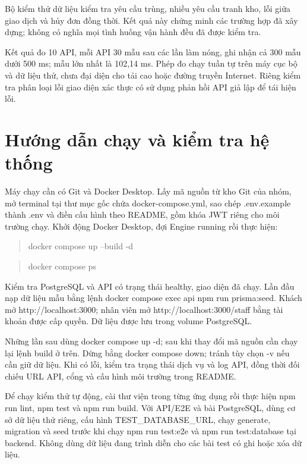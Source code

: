 \documentclass[12pt,a4paper]{report}
\begin{document}
Bộ kiểm thử dữ liệu kiểm tra yêu cầu trùng, nhiều yêu cầu tranh kho, lỗi giữa giao dịch và hủy đơn đồng thời. Kết quả này chứng minh các trường hợp đã xây dựng; không có nghĩa mọi tình huống vận hành đều đã được kiểm tra.


Kết quả đo 10 API, mỗi API 30 mẫu sau các lần làm nóng, ghi nhận cả 300 mẫu dưới 500 ms; mẫu lớn nhất là 102,14 ms. Phép đo chạy tuần tự trên máy cục bộ và dữ liệu thử, chưa đại diện cho tải cao hoặc đường truyền Internet. Riêng kiểm tra phân loại lỗi giao diện xác thực có sử dụng phản hồi API giả lập để tái hiện lỗi.


\section{Hướng dẫn chạy và kiểm tra hệ thống}

Máy chạy cần có Git và Docker Desktop. Lấy mã nguồn từ kho Git của nhóm, mở terminal tại thư mục gốc chứa docker-compose.yml, sao chép .env.example thành .env và điền cấu hình theo README, gồm khóa JWT riêng cho môi trường chạy. Khởi động Docker Desktop, đợi Engine running rồi thực hiện:


\begin{quote}\ttfamily\small docker compose up --build -d\end{quote}

\begin{quote}\ttfamily\small docker compose ps\end{quote}

Kiểm tra PostgreSQL và API có trạng thái healthy, giao diện đã chạy. Lần đầu nạp dữ liệu mẫu bằng lệnh docker compose exec api npm run prisma:seed. Khách mở http://localhost:3000; nhân viên mở http://localhost:3000/staff bằng tài khoản được cấp quyền. Dữ liệu được lưu trong volume PostgreSQL.


Những lần sau dùng docker compose up -d; sau khi thay đổi mã nguồn cần chạy lại lệnh build ở trên. Dừng bằng docker compose down; tránh tùy chọn -v nếu cần giữ dữ liệu. Khi có lỗi, kiểm tra trạng thái dịch vụ và log API, đồng thời đối chiếu URL API, cổng và cấu hình môi trường trong README.


Để chạy kiểm thử tự động, cài thư viện trong từng ứng dụng rồi thực hiện npm run lint, npm test và npm run build. Với API/E2E và bài PostgreSQL, dùng cơ sở dữ liệu thử riêng, cấu hình TEST\_DATABASE\_URL, chạy generate, migration và seed trước khi chạy npm run test:e2e và npm run test:database tại backend. Không dùng dữ liệu đang trình diễn cho các bài test có ghi hoặc xóa dữ liệu.
\end{document}
